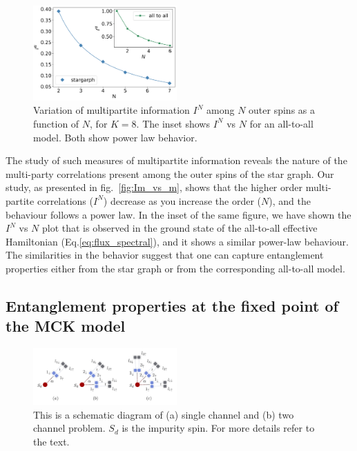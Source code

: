 \documentclass[reprint,prb,superscriptaddress]{revtex4-2}
\begin{document}
\begin{figure}
\includegraphics[width=0.49\textwidth]{2022INvsNK8.png}
\caption{Variation of multipartite information $I^N$ among \(N\) outer spins as a function of $N$, for $K=8$. The inset shows $I^N$ vs $N$ for an all-to-all model. Both show power law behavior.}
\label{fig:Im_vs_m}
\end{figure}

The study of such measures of multipartite information reveals the nature of the multi-party correlations present among the outer spins of the star graph. Our study, as presented in fig.~\eqref{fig:Im_vs_m}, shows that the higher order multi-partite correlations ($I^N$) decrease as you increase the order ($N$), and the behaviour follows a power law. In the inset of the same figure, we have shown the $I^N$ vs $N$ plot that is observed in the ground state of the all-to-all effective Hamiltonian (Eq.\ref{eq:flux_spectral}), and it shows a similar power-law behaviour. The similarities in the behavior suggest that one can capture entanglement properties either from the star graph or from the corresponding all-to-all model.

\subsection{Entanglement properties at the fixed point of the MCK model}
\label{sec:EE_excitation}

\begin{figure}[!htpb]
\includegraphics[width=0.49\textwidth]{hoppingfockstates}
\caption{This is a schematic diagram of (a) single channel and (b) two channel problem. $S_d$ is the impurity spin. For more details refer to the text.}
\label{fig:schematic_hopping}
\end{figure}
\end{document}
